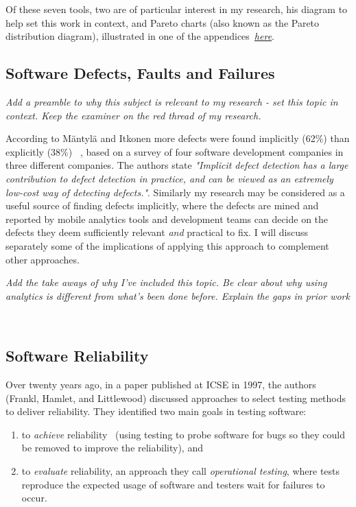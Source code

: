 Of these seven tools, two are of particular interest in my research, his diagram to help set this work in context, and Pareto charts (also known as the Pareto distribution diagram), illustrated in one of the appendices~\hyperlink{pareto.diagrams.in.r}{\emph{here}}.


\hypertarget{defects.faults.failures}{}
\subsection{Software Defects, Faults and Failures}
\emph{Add a preamble to why this subject is relevant to my research - set this topic in context. Keep the examiner on the red thread of my research.}


According to Mäntylä and Itkonen more defects were found implicitly (62\%) than explicitly (38\%) ~\cite{mantyla2014_how_are_software_defects_found}, based on a survey of four software development companies in three different companies. The authors state \emph{"Implicit defect detection has a large contribution to defect detection in practice, and can be viewed as
an extremely low-cost way of detecting defects."}. Similarly my research may be considered as a useful source of finding defects implicitly, where the defects are mined and reported by mobile analytics tools and development teams can decide on the defects they deem sufficiently relevant \emph{and} practical to fix. I will discuss separately some of the implications of applying this approach to complement other approaches.

\emph{Add the take aways of why I've included this topic. Be clear about why using analytics is different from what's been done before. Explain the gaps in prior work}

~\hypertarget{software.reliability}{}
\subsection{Software Reliability}
Over twenty years ago, in a paper published at ICSE in 1997, the authors (Frankl, Hamlet, and Littlewood) discussed approaches to select testing methods to deliver reliability. They identified two main goals in testing software: 
\begin{enumerate}
    \item to \emph{achieve} reliability~\cite{frankl1997choosing_testing_for_reliability} (using testing to probe software for bugs so they could be removed to improve the reliability), and 
    \item to \emph{evaluate} reliability, an approach they call \emph{operational testing}, where tests reproduce the expected usage of software and testers wait for failures to occur.
\end{enumerate}

